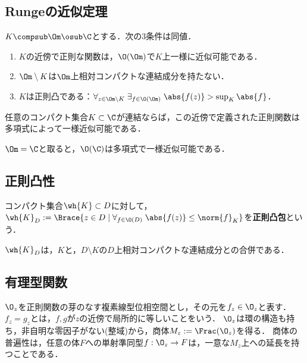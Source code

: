 \documentclass[uplatex, dvipdfmx]{jsreport}
\begin{document}
\subsection{Rungeの近似定理}

\begin{theorem}[Runge]
    $K\compsub \Om\osub\C$とする．次の3条件は同値．
    \begin{enumerate}
        \item $K$の近傍で正則な関数は，$\O(\Om)$で$K$上一様に近似可能である．
        \item $\Om\setminus K$は$\Om$上相対コンパクトな連結成分を持たない．
        \item $K$は正則凸である：$\forall_{z\in\Om\setminus K}\;\exists_{f\in\O(\Om)}\;\abs{f(z)}>\sup_{K}\abs{f}$．
    \end{enumerate}
\end{theorem}

\begin{corollary}[正則関数の一様近似]
    任意のコンパクト集合$K\subset\C$が連結ならば，この近傍で定義された正則関数は多項式によって一様近似可能である．
\end{corollary}
\begin{Proof}
    $\Om=\C$と取ると，$\O(\C)$は多項式で一様近似可能である．
\end{Proof}

\subsection{正則凸性}

\begin{definition}
    コンパクト集合$\wh{K}\subset D$に対して，$\wh{K}_D:=\Brace{z\in D\mid\forall_{f\in\O(D)}\;\abs{f(z)}\le\norm{f}_K}$を\textbf{正則凸包}という．
\end{definition}

\begin{theorem}
    $\wh{K}_D$は，$K$と，$D\setminus K$の$D$上相対コンパクトな連結成分との合併である．
\end{theorem}

\subsection{有理型関数}

\begin{notation}
    $\O_z$を正則関数の芽のなす複素線型位相空間とし，その元を$f_z\in\O_z$と表す．$f_z=g_z$とは，$f,g$が$z$の近傍で局所的に等しいことをいう．
    $\O_z$は環の構造も持ち，非自明な零因子がない(整域)から，商体$M_z:=\Frac(\O_z)$を得る．
    商体の普遍性は，任意の体$F$への単射準同型$f:\O_z\to F$は，一意な$M_z$上への延長を持つことである．
\end{notation}
\end{document}
